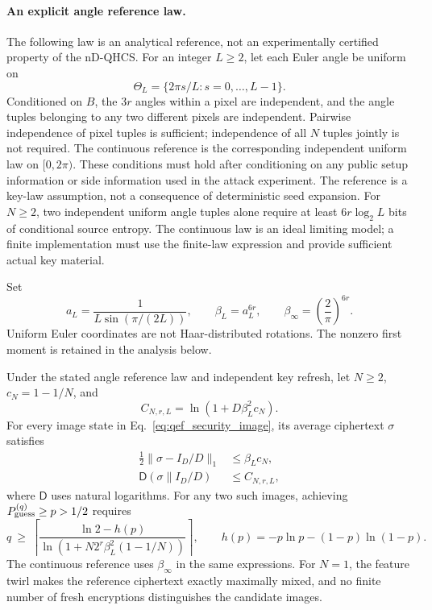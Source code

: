 {\paragraph{An explicit angle reference law.}
The following law is an analytical reference, not an experimentally
certified property of the nD-QHCS. For an integer $L\geq2$, let each
Euler angle be uniform on
\begin{equation}
 \Theta_L=\{2\pi s/L:s=0,\ldots,L-1\}.
\end{equation}
Conditioned on $B$, the $3r$ angles within a pixel are independent,
and the angle tuples belonging to any two different pixels are
independent. Pairwise independence of pixel tuples is sufficient;
independence of all $N$ tuples jointly is not required. The continuous
reference is the corresponding independent uniform law on $[0,2\pi)$.
These conditions must hold after conditioning on any public setup
information or side information used in the attack experiment.
The reference is a key-law assumption, not a consequence of deterministic
seed expansion. For $N\geq2$, two independent uniform angle tuples alone
require at least $6r\log_2L$ bits of conditional source entropy. The
continuous law is an ideal limiting model; a finite implementation must
use the finite-law expression and provide sufficient actual key material.

Set
\begin{equation}
\label{eq:qef_beta_definition}
 a_L=\frac{1}{L\sin(\pi/(2L))},\qquad
 \beta_L=a_L^{6r},\qquad
 \beta_{\infty}=\left(\frac{2}{\pi}\right)^{6r}.
\end{equation}
Uniform Euler coordinates are not Haar-distributed rotations. The
nonzero first moment is retained in the analysis below.

\begin{theorem}
\label{thm:qef_moment_sample_bound}
Under the stated angle reference law and independent key refresh, let
$N\geq2$, $c_N=1-1/N$, and
\begin{equation}
\label{eq:qef_information_budget}
 C_{N,r,L}=\ln\!\left(1+D\beta_L^2c_N\right).
\end{equation}
For every image state in Eq.~\eqref{eq:qef_security_image}, its average
ciphertext $\sigma$ satisfies
\begin{align}
 \frac12\|\sigma-I_D/D\|_1&\leq\beta_Lc_N,
 \label{eq:qef_one_image_distance}\\
 \mathsf D(\sigma\|I_D/D)&\leq C_{N,r,L},
 \label{eq:qef_cipher_relative_entropy}
\end{align}
where $\mathsf D$ uses natural logarithms. For any two such images,
achieving $P_{\rm guess}^{(q)}\geq p>1/2$ requires
\begin{equation}
\boxed{\displaystyle
 q\ \geq\
 \left\lceil
 \frac{\ln2-h(p)}{\ln(1+N2^r\beta_L^2(1-1/N))}
 \right\rceil,\qquad
 h(p)=-p\ln p-(1-p)\ln(1-p).}
\label{eq:qef_final_sample_bound}
\end{equation}
The continuous reference uses $\beta_\infty$ in the same expressions.
For $N=1$, the feature twirl makes the reference ciphertext exactly
maximally mixed, and no finite number of fresh encryptions distinguishes
the candidate images.
\end{theorem}

}
